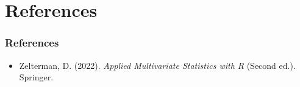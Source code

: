 \documentclass{beamer}
\begin{document}
\section*{References}
\begin{frame}
    \frametitle{References}
    \begin{itemize}
        \item Zelterman, D. (2022). \textit{Applied Multivariate Statistics with R} (Second ed.). Springer.
    \end{itemize}
\end{frame}
\end{document}
